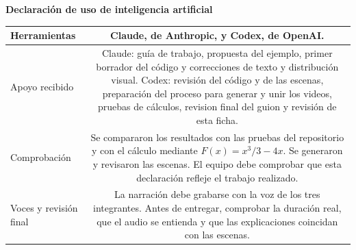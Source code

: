 \documentclass[10pt,a4paper]{article}
\newcommand{\apartado}[1]{\vspace{4pt}\textbf{\color{azul}#1}\par}
\begin{document}
\apartado{Declaración de uso de inteligencia artificial}
\begin{tabularx}{\textwidth}{|E|C|}
\hline
Herramientas & Claude, de Anthropic, y Codex, de OpenAI. \\\hline
Apoyo recibido & Claude: guía de trabajo, propuesta del ejemplo, primer borrador del código y correcciones de texto y distribución visual.\newline
Codex: revisión del código y de las escenas, preparación del proceso para generar y unir los videos, pruebas de cálculos, revision final del guion y revisión de esta ficha. \\\hline
Comprobación & Se compararon los resultados con las pruebas del repositorio y con el cálculo mediante $F(x)=x^3/3-4x$. Se generaron y revisaron las escenas. El equipo debe comprobar que esta declaración refleje el trabajo realizado. \\\hline
Voces y revisión final & La narración debe grabarse con la voz de los tres integrantes. Antes de entregar, comprobar la duración real, que el audio se entienda y que las explicaciones coincidan con las escenas. \\\hline
\end{tabularx}
\end{document}
